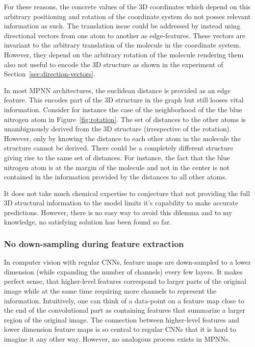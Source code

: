 For these reasons, the concrete values of the 3D coordinates which depend on this arbitrary positioning and rotation of the coordinate system do not posses relevant information as such. The translation issue could be addressed by instead using directional vectors from one atom to another as edge-features. These vectors are invariant to the arbitrary translation of the molecule in the coordinate system. However, they depend on the arbitrary rotation of the molecule rendering them also not useful to encode the 3D structure as shown in the experiment of Section~\ref{sec:direction-vectors}.

In most MPNN architectures, the euclidean distance is provided as an edge feature. This encodes part of the 3D structure in the graph but still looses vital information. Consider for instance the case of the neighborhood of the the blue nitrogen atom in Figure~\ref{fig:rotation}. The set of distances to the other atoms is unambiguously derived from the 3D structure (irrespective of the rotation). However, only by knowing the distance to each other atom in the molecule the structure cannot be derived. There could be a completely different structure giving rise to the same set of distances. For instance, the fact that the blue nitrogen atom is at the margin of the molecule and not in the center is not contained in the information provided by the distances to all other atoms.


It does not take much chemical expertise to conjecture that not providing the full 3D structural information to the model limits it's capability to make accurate predictions. However, there is no easy way to avoid this dilemma and to my knowledge, no satisfying solution has been found so far.

\subsubsection{No down-sampling during feature extraction}

In computer vision with regular CNNs, feature maps are down-sampled to a lower dimension (while expanding the number of channels) every few layers. It makes perfect sense, that higher-level features correspond to larger parts of the original image while at the same time requiring more channels to represent the information. Intuitively, one can think of a data-point on a feature map close to the end of the convolutional part as containing features that summarize a larger region of the original image. The connection between higher-level features and lower dimension feature maps is so central to regular CNNs that it is hard to imagine it any other way. However, no analogous process exists in MPNNs.

